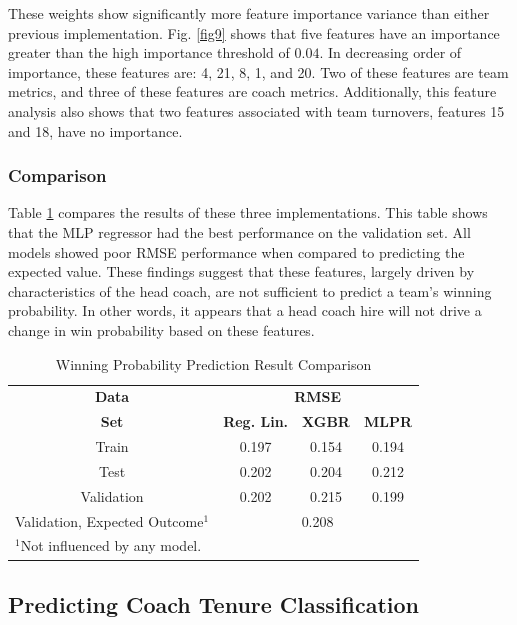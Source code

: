 \documentclass[conference]{IEEEtran}
\begin{document}
These weights show significantly more feature importance variance than either previous implementation. Fig. \ref{fig9} shows that five features have an importance greater than the high importance threshold of $0.04$. In decreasing order of importance, these features are: 4, 21, 8, 1, and 20. Two of these features are team metrics, and three of these features are coach metrics. Additionally, this feature analysis also shows that two features associated with team turnovers, features 15 and 18, have no importance.

\subsubsection{Comparison}
Table \ref{cum1} compares the results of these three implementations. This table shows that the MLP regressor had the best performance on the validation set. All models showed poor RMSE performance when compared to predicting the expected value. These findings suggest that these features, largely driven by characteristics of the head coach, are not sufficient to predict a team's winning probability. In other words, it appears that a head coach hire will not drive a change in win probability based on these features.

\begin{table}[htbp]
\caption{Winning Probability Prediction Result Comparison}
\begin{center}
\begin{tabular}{|c||c|c|c|}
\hline
\textbf{Data} & \multicolumn{3}{|c|}{\textbf{RMSE}}\\
\cline{2-4} 
\textbf{Set} & \textbf{Reg. Lin.} &  \textbf{XGBR} &  \textbf{MLPR} \\
\hline
\hline
Train & 0.197 & 0.154 & 0.194\\
\hline
Test & 0.202 & 0.204 & 0.212 \\
\hline
Validation & 0.202 & 0.215 & 0.199 \\
\hline
Validation, Expected Outcome$^{\mathrm{1}}$ & \multicolumn{3}{|c|}{0.208} \\
\hline
\multicolumn{2}{l}{$^{\mathrm{1}}$Not influenced by any model.}
\end{tabular}
\label{cum1}
\end{center}
\end{table}

\subsection{Predicting Coach Tenure Classification}
\end{document}
